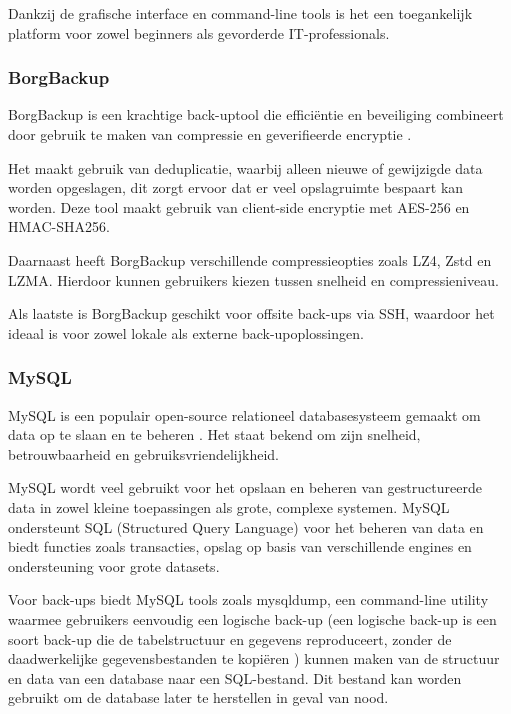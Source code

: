 Dankzij de grafische interface en command-line tools is het een toegankelijk platform voor zowel beginners als gevorderde IT-professionals. 

\subsubsection{BorgBackup}
BorgBackup is een krachtige back-uptool die efficiëntie en beveiliging combineert door gebruik te maken van compressie en geverifieerde encryptie \autocite{BorgBackup2024}.   

Het maakt gebruik van deduplicatie, waarbij alleen nieuwe of gewijzigde data worden opgeslagen, dit zorgt ervoor dat er veel opslagruimte bespaart kan worden. Deze tool maakt gebruik van client-side encryptie met AES-256 en HMAC-SHA256. 

Daarnaast heeft BorgBackup verschillende compressieopties zoals LZ4, Zstd en LZMA. Hierdoor kunnen gebruikers kiezen tussen snelheid en compressieniveau. 

Als laatste is BorgBackup geschikt voor offsite back-ups via SSH, waardoor het ideaal is voor zowel lokale als externe back-upoplossingen.


\subsubsection{MySQL}
MySQL is een populair open-source relationeel databasesysteem gemaakt om data op te slaan en te beheren \autocite{Erickson2024}. Het staat bekend om zijn snelheid, betrouwbaarheid en gebruiksvriendelijkheid. 

MySQL wordt veel gebruikt voor het opslaan en beheren van gestructureerde data in zowel kleine toepassingen als grote, complexe systemen. MySQL ondersteunt SQL (Structured Query Language) voor het beheren van data en biedt functies zoals transacties, opslag op basis van verschillende engines en ondersteuning voor grote datasets. 

Voor back-ups biedt MySQL tools zoals mysqldump, een command-line utility waarmee gebruikers eenvoudig een logische back-up (een logische back-up is een soort back-up die de tabelstructuur en gegevens reproduceert, zonder de daadwerkelijke gegevensbestanden te kopiëren \autocite{MySQL}) kunnen maken van de structuur en data van een database naar een SQL-bestand. Dit bestand kan worden gebruikt om de database later te herstellen in geval van nood. 
















